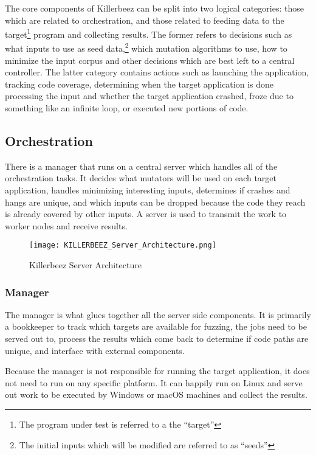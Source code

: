 The core components of Killerbeez can be split into two logical categories:
those which are related to orchestration, and those related to feeding data
to the target\footnote{The program under test is referred to a the ``target''}
program and collecting results.  The former refers to decisions such as what
inputs to use as seed data,\footnote{The initial inputs which will be modified
are referred to as ``seeds''} which mutation algorithms to use, how to minimize
the input corpus and other decisions which are best left to a central
controller.  The latter category contains actions such as launching the
application, tracking code coverage, determining when the target application is
done processing the input and whether the target application crashed, froze due
to something like an infinite loop, or executed new portions of code.

\subsection{Orchestration}
There is a manager that runs on a central server which handles all of the
orchestration tasks.  It decides what mutators will be used on each target
application, handles minimizing interesting inputs, determines if crashes
and hangs are unique, and which inputs can be dropped because the code they
reach is already covered by other inputs. A \BOINC{} server is used to transmit
the work to worker nodes and receive results.

\begin{figure*}[htb]
\centering
\texttt{[image: KILLERBEEZ\_Server\_Architecture.png]}
\caption{Killerbeez Server Architecture}
\label{fig:Killerbeez-server}
\end{figure*}

\subsubsection{Manager} \label{Manager Overview}
The manager is what glues together all the server side components.  It is
primarily a bookkeeper to track which targets are available for fuzzing,
the jobs need to be served out to, process the results which come back to
determine if code paths are unique, and interface with external components.

Because the manager is not responsible for running the target application, it
does not need to run on any specific platform.  It can happily run on Linux and
serve out work to be executed by Windows or macOS machines and collect the
results.

